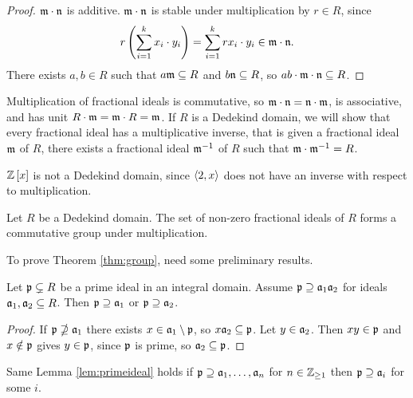 \begin{proof}
$ \mm \cdot \nn $ is additive. $ \mm \cdot \nn $ is stable under multiplication by $ r \in R $, since
$$ r\rb{\sum_{i = 1}^k x_i \cdot y_i} = \sum_{i = 1}^k rx_i \cdot y_i \in \mm \cdot \nn. $$
There exists $ a, b \in R $ such that $ a\mm \subseteq R $ and $ b\nn \subseteq R $, so $ ab \cdot \mm \cdot \nn \subseteq R $.
\end{proof}

Multiplication of fractional ideals is commutative, so $ \mm \cdot \nn = \nn \cdot \mm $, is associative, and has unit $ R \cdot \mm = \mm \cdot R = \mm $. If $ R $ is a Dedekind domain, we will show that every fractional ideal has a multiplicative inverse, that is given a fractional ideal $ \mm $ of $ R $, there exists a fractional ideal $ \mm^{-1} $ of $ R $ such that $ \mm \cdot \mm^{-1} = R $.

\begin{example*}
$ \Z\sb{x} $ is not a Dedekind domain, since $ \ab{2, x} $ does not have an inverse with respect to multiplication.
\end{example*}

\begin{theorem}
\label{thm:group}
Let $ R $ be a Dedekind domain. The set of non-zero fractional ideals of $ R $ forms a commutative group under multiplication.
\end{theorem}

To prove Theorem \ref{thm:group}, need some preliminary results.

\begin{lemma}
\label{lem:primeideal}
Let $ \pp \subsetneq R $ be a prime ideal in an integral domain. Assume $ \pp \supseteq \aa_1\aa_2 $ for ideals $ \aa_1, \aa_2 \subseteq R $. Then $ \pp \supseteq \aa_1 $ or $ \pp \supseteq \aa_2 $.
\end{lemma}

\begin{proof}
If $ \pp \nsupseteq \aa_1 $ there exists $ x \in \aa_1 \setminus \pp $, so $ x\aa_2 \subseteq \pp $. Let $ y \in \aa_2 $. Then $ xy \in \pp $ and $ x \notin \pp $ gives $ y \in \pp $, since $ \pp $ is prime, so $ \aa_2 \subseteq \pp $.
\end{proof}

\begin{remark*}
Same Lemma \ref{lem:primeideal} holds if $ \pp \supseteq \aa_1, \dots, \aa_n $ for $ n \in \Z_{\ge 1} $ then $ \pp \supseteq \aa_i $ for some $ i $.
\end{remark*}

